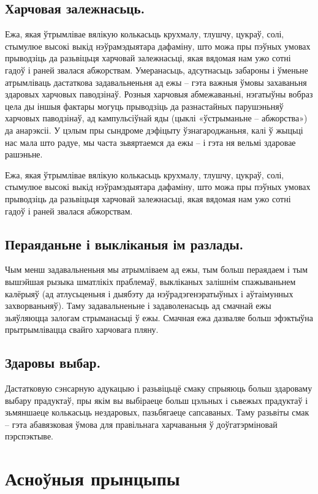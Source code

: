 \subsection{Харчовая залежнасьць.}
Ежа, якая ўтрымлівае вялікую колькасьць крухмалу, тлушчу, цукраў, солі, стымулюе высокі выкід нэўрамэдыятара дафаміну, што можа пры пэўных умовах прыводзіць да разьвіцьця харчовай залежнасьці, якая вядомая нам ужо сотні гадоў і раней звалася абжорствам. Умеранасьць, адсутнасьць забароны і ўменьне атрымліваць дастаткова задавальненьня ад ежы – гэта важныя ўмовы захаваньня здаровых харчовых паводзінаў. Розныя харчовыя абмежаваньні, нэгатыўны вобраз цела ды іншыя фактары могуць прыводзіць да разнастайных парушэньняў харчовых паводзінаў, ад кампульсіўнай яды (цыклі «ўстрыманьне – абжорства») да анарэксіі. У цэлым пры сындроме дэфіцыту ўзнагароджаньня, калі ў жыцьці нас мала што радуе, мы часта зьвяртаемся да ежы – і гэта ня вельмі здаровае рашэньне.

Ежа, якая ўтрымлівае вялікую колькасьць крухмалу, тлушчу, цукраў, солі, стымулюе высокі выкід нэўрамэдыятара дафаміну, што можа пры пэўных умовах прыводзіць да разьвіцьця харчовай залежнасьці, якая вядомая нам ужо сотні гадоў і раней звалася абжорствам.

\subsection{Пераяданьне і выкліканыя ім разлады.}
Чым менш задавальненьня мы атрымліваем ад ежы, тым больш пераядаем і тым вышэйшая рызыка шматлікіх праблемаў, выкліканых залішнім спажываньнем калёрыяў (ад атлусьценьня і дыябэту да нэўрадэгенэратыўных і аўтаімунных захворваньняў). Таму задавальненьне і задаволенасьць ад смачнай ежы зьяўляюцца залогам стрыманасьці ў ежы. Смачная ежа дазваляе больш эфэктыўна прытрымлівацца свайго харчовага пляну.

\subsection{Здаровы выбар.}
Дастатковую сэнсарную адукацыю і разьвіцьцё смаку спрыяюць больш здароваму выбару прадуктаў, пры якім вы выбіраеце больш цэльных і сьвежых прадуктаў і зьмяншаеце колькасьць нездаровых, пазьбягаеце сапсаваных. Таму разьвіты смак – гэта абавязковая ўмова для правільнага харчаваньня ў доўгатэрміновай пэрспэктыве.

\section{Асноўныя прынцыпы}

